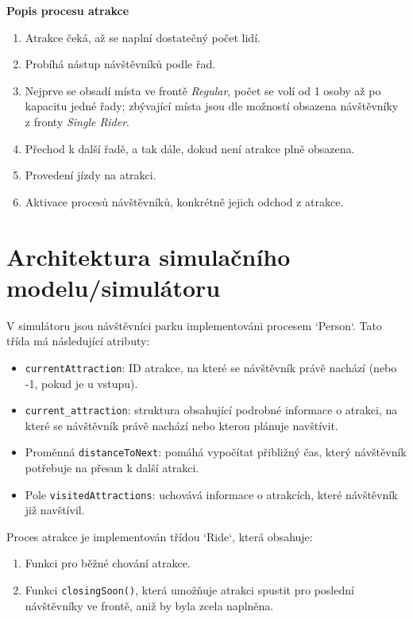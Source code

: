 \documentclass[a4paper,12pt]{article}
\begin{document}
\textbf{Popis procesu atrakce}
\begin{enumerate}[label=\textbf{\arabic*.}]
    \item Atrakce čeká, až se naplní dostatečný počet lidí.
    \item Probíhá nástup návštěvníků podle řad.
    \item Nejprve se obsadí místa ve frontě \textit{Regular}, počet se volí od 1 osoby až po kapacitu jedné řady; zbývající místa jsou dle možností obsazena návštěvníky z fronty \textit{Single Rider}.
    \item Přechod k další řadě, a tak dále, dokud není atrakce plně obsazena.
    \item Provedení jízdy na atrakci.
    \item Aktivace procesů návštěvníků, konkrétně jejich odchod z atrakce.
\end{enumerate}

\section{Architektura simulačního modelu/simulátoru}
V simulátoru jsou návštěvníci parku implementováni procesem `Person`. Tato třída má následující atributy:  

\begin{itemize}
    \item \texttt{currentAttraction}: ID atrakce, na které se návštěvník právě nachází (nebo -1, pokud je u vstupu).  
    \item \texttt{current\_attraction}: struktura obsahující podrobné informace o atrakci, na které se návštěvník právě nachází nebo kterou plánuje navštívit.  
    \item Proměnná \texttt{distanceToNext}: pomáhá vypočítat přibližný čas, který návštěvník potřebuje na přesun k další atrakci.  
    \item Pole \texttt{visitedAttractions}: uchovává informace o atrakcích, které návštěvník již navštívil.  
\end{itemize}

Proces atrakce je implementován třídou `Ride`, která obsahuje:  

\begin{enumerate}
    \item Funkci pro běžné chování atrakce.  
    \item Funkci \texttt{closingSoon()}, která umožňuje atrakci spustit pro poslední návštěvníky ve frontě, aniž by byla zcela naplněna.  
\end{enumerate} 
\end{document}
